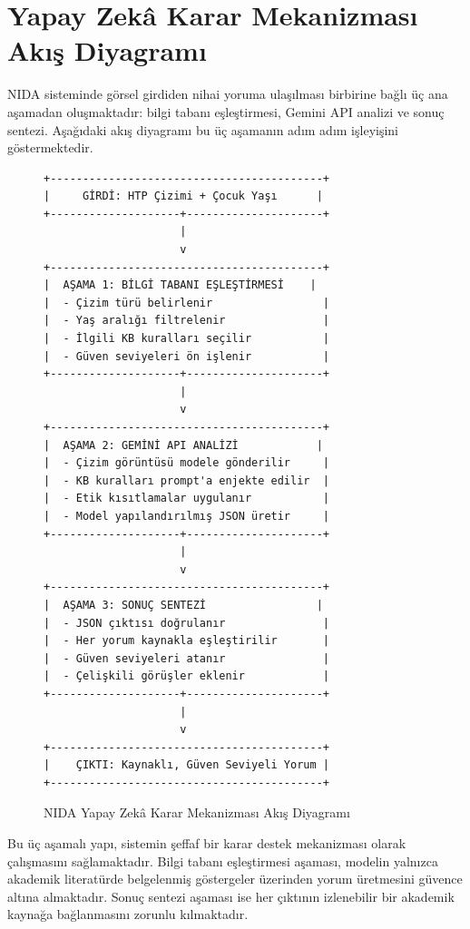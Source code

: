 \section{Yapay Zekâ Karar Mekanizması Akış Diyagramı}

NIDA sisteminde görsel girdiden nihai yoruma ulaşılması birbirine bağlı üç ana aşamadan oluşmaktadır: bilgi tabanı eşleştirmesi, Gemini API analizi ve sonuç sentezi. Aşağıdaki akış diyagramı bu üç aşamanın adım adım işleyişini göstermektedir.

\begin{figure}[h!]
\centering
\begin{tcolorbox}[colback=gray!5, colframe=gray!75, width=0.90\textwidth, title=Yapay Zekâ Karar Mekanizması]
\begin{verbatim}
+------------------------------------------+
|     GİRDİ: HTP Çizimi + Çocuk Yaşı      |
+--------------------+---------------------+
                     |
                     v
+------------------------------------------+
|  AŞAMA 1: BİLGİ TABANI EŞLEŞTİRMESİ    |
|  - Çizim türü belirlenir                 |
|  - Yaş aralığı filtrelenir               |
|  - İlgili KB kuralları seçilir           |
|  - Güven seviyeleri ön işlenir           |
+--------------------+---------------------+
                     |
                     v
+------------------------------------------+
|  AŞAMA 2: GEMİNİ API ANALİZİ            |
|  - Çizim görüntüsü modele gönderilir     |
|  - KB kuralları prompt'a enjekte edilir  |
|  - Etik kısıtlamalar uygulanır           |
|  - Model yapılandırılmış JSON üretir     |
+--------------------+---------------------+
                     |
                     v
+------------------------------------------+
|  AŞAMA 3: SONUÇ SENTEZİ                 |
|  - JSON çıktısı doğrulanır               |
|  - Her yorum kaynakla eşleştirilir       |
|  - Güven seviyeleri atanır               |
|  - Çelişkili görüşler eklenir            |
+--------------------+---------------------+
                     |
                     v
+------------------------------------------+
|    ÇIKTI: Kaynaklı, Güven Seviyeli Yorum |
+------------------------------------------+
\end{verbatim}
\end{tcolorbox}
\caption{NIDA Yapay Zekâ Karar Mekanizması Akış Diyagramı}
\label{fig:karar-mekanizmasi}
\end{figure}

Bu üç aşamalı yapı, sistemin şeffaf bir karar destek mekanizması olarak çalışmasını sağlamaktadır. Bilgi tabanı eşleştirmesi aşaması, modelin yalnızca akademik literatürde belgelenmiş göstergeler üzerinden yorum üretmesini güvence altına almaktadır. Sonuç sentezi aşaması ise her çıktının izlenebilir bir akademik kaynağa bağlanmasını zorunlu kılmaktadır.

\newpage
